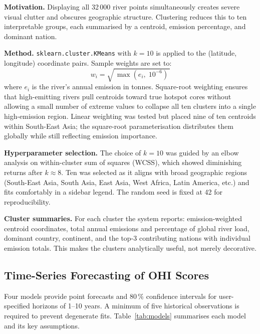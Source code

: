 \documentclass[10pt,twocolumn]{article}
\newcommand{\tool}[1]{\texttt{#1}}
\begin{document}
\textbf{Motivation.}
Displaying all 32\,000 river points simultaneously creates severe visual
clutter and obscures geographic structure.
Clustering reduces this to ten interpretable groups, each summarised by a
centroid, emission percentage, and dominant nation.

\textbf{Method.}
\tool{sklearn.cluster.KMeans} with $k = 10$ is applied to the
(latitude, longitude) coordinate pairs.
Sample weights are set to:
\[
  w_i = \sqrt{\,\max(e_i,\;10^{-6})\,}
\]
where $e_i$ is the river's annual emission in tonnes.
Square-root weighting ensures that high-emitting rivers pull centroids toward
true hotspot cores without allowing a small number of extreme values to
collapse all ten clusters into a single high-emission region.
Linear weighting was tested but placed nine of ten centroids within
South-East Asia; the square-root parameterisation distributes them globally
while still reflecting emission importance.

\textbf{Hyperparameter selection.}
The choice of $k = 10$ was guided by an elbow analysis on within-cluster sum
of squares (WCSS), which showed diminishing returns after $k \approx 8$.
Ten was selected as it aligns with broad geographic regions (South-East Asia,
South Asia, East Asia, West Africa, Latin America, etc.) and fits comfortably
in a sidebar legend.
The random seed is fixed at 42 for reproducibility.

\textbf{Cluster summaries.}
For each cluster the system reports: emission-weighted centroid coordinates,
total annual emissions and percentage of global river load, dominant country,
continent, and the top-3 contributing nations with individual emission totals.
This makes the clusters analytically useful, not merely decorative.

\subsection{Time-Series Forecasting of OHI Scores}

Four models provide point forecasts and 80\,\% confidence intervals for
user-specified horizons of 1--10 years.
A minimum of five historical observations is required to prevent degenerate
fits.
Table~\ref{tab:models} summarises each model and its key assumptions.

\begin{table}[ht]
\centering
\small
\caption{Forecast models, assumptions, and CI method.}
\label{tab:models}
\end{table}
\end{document}
